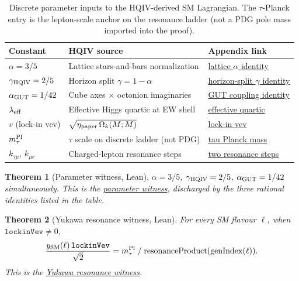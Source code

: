 \documentclass[11pt]{amsart}
\newtheorem{theorem}{Theorem}[section]
\begin{document}
\begin{table}[ht]
\caption{Discrete parameter inputs to the HQIV-derived SM Lagrangian. The
$\tau$-Planck entry is the lepton-scale anchor on the resonance ladder (not a
PDG pole mass imported into the proof).}
\label{tab:SM-parameters}
\centering
\footnotesize
\begin{tabular}{@{}p{4.0cm}p{5.0cm}p{4.4cm}@{}}
\toprule
Constant & HQIV source & Appendix link \\
\midrule
$\alpha=3/5$ & Lattice stars-and-bars normalization &
  \hyperref[lean:alpha-35]{lattice $\alpha$ identity} \\
$\gamma_{\rm HQIV}=2/5$ & Horizon split $\gamma=1-\alpha$ &
  \hyperref[lean:gamma-25]{horizon-split $\gamma$ identity} \\
$\alpha_{\rm GUT}=1/42$ & Cube axes $\times$ octonion imaginaries &
  \hyperref[lean:alpha-gut]{GUT coupling identity} \\
$\lambda_{\rm eff}$ & Effective Higgs quartic at EW shell &
  \hyperref[lean:lambda-eff]{effective quartic} \\
$v$ (lock-in vev) & $\sqrt{\eta_{\rm paper}\,\Omega_k(M;M)}$ &
  \hyperref[lean:lockin-vev]{lock-in vev} \\
$m_\tau^{\rm Pl}$ & $\tau$ scale on discrete ladder (not PDG) &
  \hyperref[lean:m-tau-pl]{tau Planck mass} \\
$k_{\tau\mu}$, $k_{\mu e}$ & Charged-lepton resonance steps &
  \hyperref[lean:resonance-steps]{two resonance steps} \\
\bottomrule
\end{tabular}
\end{table}

\begin{theorem}[Parameter witness, Lean]
\label{thm:param-witness}
$\alpha=3/5$, $\gamma_{\rm HQIV}=2/5$, $\alpha_{\rm GUT}=1/42$
simultaneously. This is the \hyperref[lean:param-witness]{parameter witness},
discharged by the three rational identities listed in the table.
\end{theorem}

\begin{theorem}[Yukawa resonance witness, Lean]
\label{thm:yukawa-resonance-witness}
For every SM flavour $\ell$, when $\texttt{lockinVev}\neq 0$,
\[
\frac{y_{\rm SM}(\ell)\,\texttt{lockinVev}}{\sqrt{2}}
= m_\tau^{\rm Pl}\;/\;\mathrm{resonanceProduct}(\mathrm{genIndex}(\ell)).
\]
This is the \hyperref[lean:yukawa-resonance]{Yukawa resonance witness}.
\end{theorem}
\end{document}

